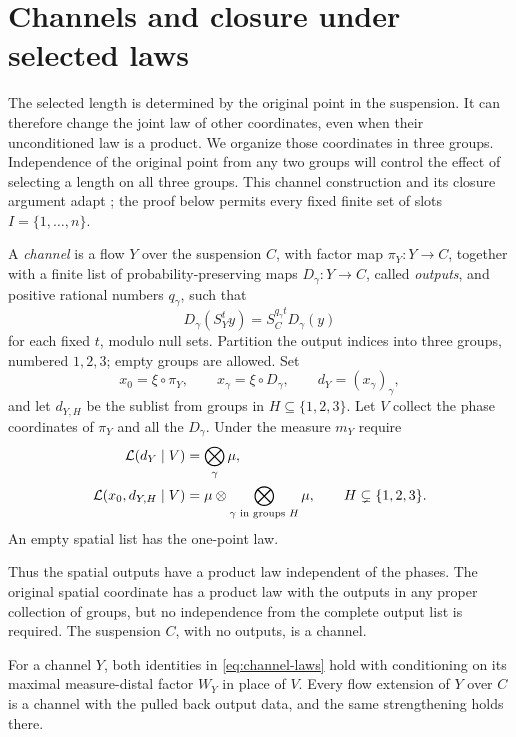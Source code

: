 \section{Channels and closure under selected laws}\label{sec:channels}

The selected length is determined by the original point in the suspension.
It can therefore change the joint law of other coordinates, even when
their unconditioned law is a product.  We organize those coordinates in
three groups.  Independence of the original point from any two groups
will control the effect of selecting a length on all three groups.
This channel construction and its closure argument adapt
\cite[Section~5]{FourfoldCompanion}; the proof below permits every fixed
finite set of slots $I=\{1,\ldots,n\}$.

\begin{definition}[Channel]\label{def:channel}
A \emph{channel} is a flow $Y$ over the suspension $C$, with factor map
$\pi_Y:Y\to C$, together with a finite list of probability-preserving
maps $D_\gamma:Y\to C$, called \emph{outputs}, and positive rational
numbers $q_\gamma$, such that
\[
 D_\gamma(S_Y^t y)=S_C^{q_\gamma t}D_\gamma(y)
\]
for each fixed $t$, modulo null sets.  Partition the output indices into
three groups, numbered $1,2,3$; empty groups are allowed.  Set
\[
 x_0=\xi\circ\pi_Y,\qquad x_\gamma=\xi\circ D_\gamma,
 \qquad d_Y=(x_\gamma)_\gamma,
\]
and let $d_{Y,H}$ be the sublist from groups in
$H\subseteq\{1,2,3\}$.  Let $V$ collect the phase coordinates of
$\pi_Y$ and all the $D_\gamma$.  Under the measure $m_Y$ require
\begin{equation}\label{eq:channel-laws}
 \begin{split}
  \mathcal L(d_Y\mid V)&=\bigotimes_\gamma\mu,\\
  \mathcal L(x_0,d_{Y,H}\mid V)&=
       \mu\otimes\bigotimes_{\gamma\text{ in groups }H}\mu,
       \qquad H\subsetneq\{1,2,3\}.
 \end{split}
\end{equation}
An empty spatial list has the one-point law.
\end{definition}

Thus the spatial outputs have a product law independent of the phases.
The original spatial coordinate has a product law with the outputs in
any proper collection of groups, but no independence from the complete
output list is required.  The suspension $C$, with no outputs, is a
channel.

\begin{lemma}\label{lem:channel-conditioning}
For a channel $Y$, both identities in \eqref{eq:channel-laws} hold with
conditioning on its maximal measure-distal factor $W_Y$ in place of
$V$.  Every flow extension of $Y$ over $C$ is a channel with the pulled
back output data, and the same strengthening holds there.
\end{lemma}

